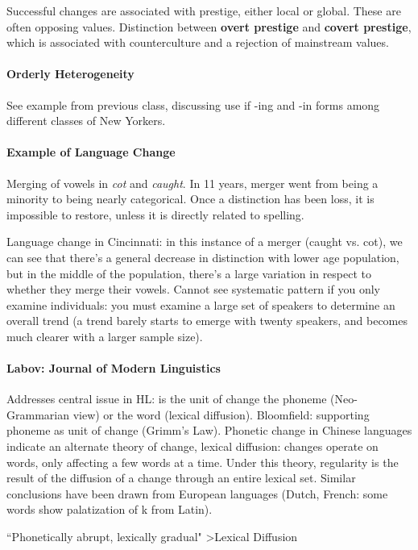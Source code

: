 \documentclass{exam}
\begin{document}
Successful changes are associated with prestige, either local or global. These are often opposing values. Distinction between \textbf{overt prestige} and \textbf{covert prestige}, which is associated with counterculture and a rejection of mainstream values. 

\paragraph{Orderly Heterogeneity} See example from previous class, discussing use if -ing and -in forms among different classes of New Yorkers. 

\paragraph{Example of Language Change} Merging of vowels in \textit{cot} and \textit{caught}. In 11 years, merger went from being a minority to being nearly categorical. Once a distinction has been loss, it is impossible to restore, unless it is directly related to spelling. 

Language change in Cincinnati: in this instance of a merger (caught vs. cot), we can see that there's a general decrease in distinction with lower age population, but in the middle of the population, there's a large variation in respect to whether they merge their vowels. Cannot see systematic pattern if you only examine individuals: you must examine a large set of speakers to determine an overall trend (a trend barely starts to emerge with twenty speakers, and becomes much clearer with a larger sample size). 

\paragraph{Labov: Journal of Modern Linguistics} Addresses central issue in HL: is the unit of change the phoneme (Neo-Grammarian view) or the word (lexical diffusion). Bloomfield: supporting phoneme as unit of change (Grimm's Law). Phonetic change in Chinese languages indicate an alternate theory of change, lexical diffusion: changes operate on words, only affecting a few words at a time. Under this theory, regularity is the result of the diffusion of a change through an entire lexical set. Similar conclusions have been drawn from European languages (Dutch, French: some words show palatization of k from Latin).

``Phonetically abrupt, lexically gradual" >Lexical Diffusion
\end{document}
